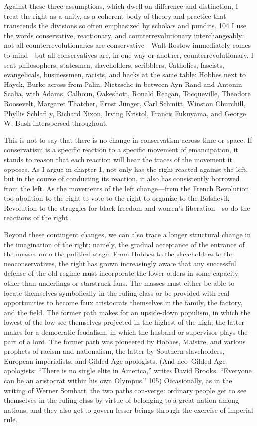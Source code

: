  \par 
Against these three assumptions, which dwell on difference and distinction, I treat the right as a unity, as a coherent body of theory and practice that transcends the divisions so often emphasized by scholars and pundits. {\color{blue}104} I use the words conservative, reactionary, and counterrevolutionary interchangeably: not all counterrevolutionaries are conservative—Walt Rostow immediately comes to mind—but all conservatives are, in one way or another, counterrevolutionary. I seat philosophers, statesmen, slaveholders, scribblers, Catholics, fascists, evangelicals, businessmen, racists, and hacks at the same table: Hobbes next to Hayek, Burke across from Palin, Nietzsche in between Ayn Rand and Antonin Scalia, with Adams, Calhoun, Oakeshott, Ronald Reagan, Tocqueville, Theodore Roosevelt, Margaret Thatcher, Ernst Jünger, Carl Schmitt, Winston Churchill, Phyllis Schlafl y, Richard Nixon, Irving Kristol, Francis Fukuyama, and George W. Bush interspersed throughout.
 \par 
This is not to say that there is no change in conservatism across time or space. If conservatism is a specific reaction to a specific movement of emancipation, it stands to reason that each reaction will bear the traces of the movement it opposes. As I argue in chapter 1, not only has the right reacted against the left, but in the course of conducting its reaction, it also has consistently borrowed from the left. As the movements of the left change—from the French Revolution too abolition to the right to vote to the right to organize to the Bolshevik Revolution to the struggles for black freedom and women’s liberation—so do the reactions of the right.
 \par 
Beyond these contingent changes, we can also trace a longer structural change in the imagination of the right: namely, the gradual acceptance of the entrance of the masses onto the political stage. From Hobbes to the slaveholders to the neoconservatives, the right has grown increasingly aware that any successful defense of the old regime must incorporate the lower orders in some capacity other than underlings or starstruck fans. The masses must either be able to locate themselves symbolically in the ruling class or be provided with real opportunities to become faux aristocrats themselves in the family, the factory, and the field. The former path makes for an upside-down populism, in which the lowest of the low see themselves projected in the highest of the high; the latter makes for a democratic feudalism, in which the husband or supervisor plays the part of a lord. The former path was pioneered by Hobbes, Maistre, and various prophets of racism and nationalism, the latter by Southern slaveholders, European imperialists, and Gilded Age apologists. (And neo–Gilded Age apologists: “There is no single elite in America,” writes David Brooks. “Everyone can be an aristocrat within his own Olympus.” {\color{blue}105}) Occasionally, as in the writing of Werner Sombart, the two paths con-verge: ordinary people get to see themselves in the ruling class by virtue of belonging to a great nation among nations, and they also get to govern lesser beings through the exercise of imperial rule.
